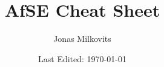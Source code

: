 


\begin{titlepage}
  \title{AfSE Cheat Sheet} %
  \author{Jonas Milkovits}
  \date{Last Edited: \today}
\end{titlepage}








